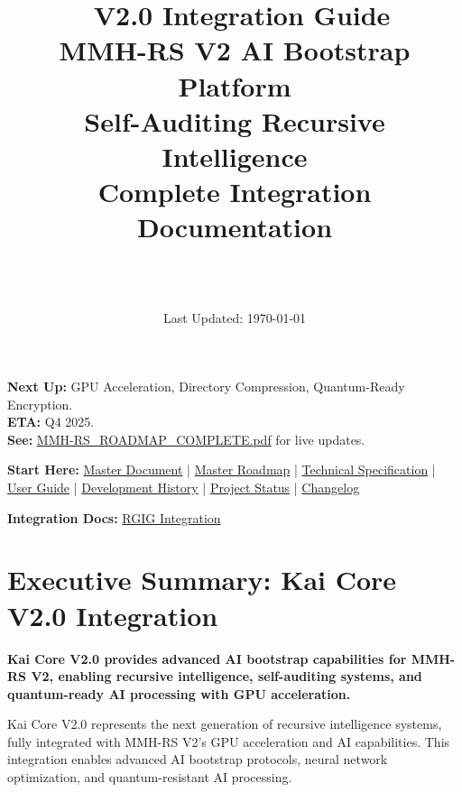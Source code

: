 \documentclass[12pt,a4paper]{article}
\title{\Huge\textbf{\project\ V2.0 Integration Guide}\\[0.5cm]
\Large\textbf{MMH-RS V2 AI Bootstrap Platform}\\[0.3cm]
\large Self-Auditing Recursive Intelligence\\[0.5cm]
\large Complete Integration Documentation}
\author{\Large\authorname\\[0.2cm]\email\\[0.2cm]\github}
\date{\large Last Updated: \today}
\begin{document}
\maketitle
\thispagestyle{empty}

\begin{tcolorbox}[colback=orange!10,colframe=orange!50,title=\textbf{V2 GPU/Quantum Features in Active Development}]
\textbf{Next Up:} GPU Acceleration, Directory Compression, Quantum-Ready Encryption.\\
\textbf{ETA:} Q4 2025.\\
\textbf{See:} \href{MMH-RS_ROADMAP_COMPLETE.pdf}{MMH-RS\_ROADMAP\_COMPLETE.pdf} for live updates.
\end{tcolorbox}

\begin{tcolorbox}[colback=blue!10,colframe=blue!50,title=\textbf{Full Documentation Suite}]
\textbf{Start Here:} \href{MMH-RS_MASTER_DOCUMENT.pdf}{Master Document} | \href{MMH-RS_ROADMAP_COMPLETE.pdf}{Master Roadmap} | \href{MMH-RS_TECHNICAL_COMPLETE.pdf}{Technical Specification} | \href{USER_GUIDE.md}{User Guide} | \href{DEVELOPMENT_HISTORY.md}{Development History} | \href{PROJECT_STATUS.md}{Project Status} | \href{CHANGELOG.md}{Changelog}

\textbf{Integration Docs:} \href{RGIG_INTEGRATION_COMPLETE.pdf}{RGIG Integration}
\end{tcolorbox}

\tableofcontents
\newpage

\section{Executive Summary: Kai Core V2.0 Integration}

\begin{tcolorbox}[colback=v2blue!10,colframe=v2blue!50,title=\textbf{Kai Core V2.0 Integration Summary}]
\textbf{Kai Core V2.0 provides advanced AI bootstrap capabilities for MMH-RS V2, enabling recursive intelligence, self-auditing systems, and quantum-ready AI processing with GPU acceleration.}

Kai Core V2.0 represents the next generation of recursive intelligence systems, fully integrated with MMH-RS V2's GPU acceleration and AI capabilities. This integration enables advanced AI bootstrap protocols, neural network optimization, and quantum-resistant AI processing.
\end{tcolorbox}
\end{document}

